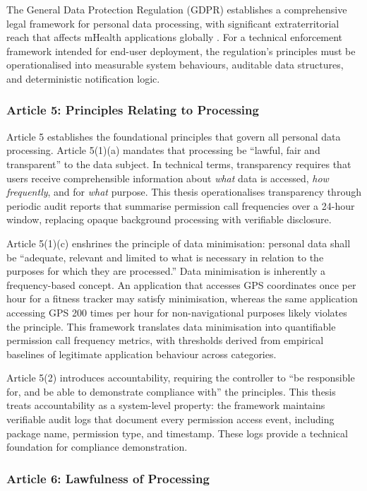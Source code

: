 The General Data Protection Regulation (GDPR) establishes a comprehensive legal framework for personal data processing, with significant extraterritorial reach that affects mHealth applications globally \cite{1}. For a technical enforcement framework intended for end-user deployment, the regulation's principles must be operationalised into measurable system behaviours, auditable data structures, and deterministic notification logic.

\subsubsection{Article 5: Principles Relating to Processing}

Article 5 establishes the foundational principles that govern all personal data processing. Article 5(1)(a) mandates that processing be ``lawful, fair and transparent'' to the data subject. In technical terms, transparency requires that users receive comprehensible information about \emph{what} data is accessed, \emph{how frequently}, and for \emph{what} purpose. This thesis operationalises transparency through periodic audit reports that summarise permission call frequencies over a 24-hour window, replacing opaque background processing with verifiable disclosure.

Article 5(1)(c) enshrines the principle of data minimisation: personal data shall be ``adequate, relevant and limited to what is necessary in relation to the purposes for which they are processed.'' Data minimisation is inherently a frequency-based concept. An application that accesses GPS coordinates once per hour for a fitness tracker may satisfy minimisation, whereas the same application accessing GPS 200 times per hour for non-navigational purposes likely violates the principle. This framework translates data minimisation into quantifiable permission call frequency metrics, with thresholds derived from empirical baselines of legitimate application behaviour across categories.

Article 5(2) introduces accountability, requiring the controller to ``be responsible for, and be able to demonstrate compliance with'' the principles. This thesis treats accountability as a system-level property: the framework maintains verifiable audit logs that document every permission access event, including package name, permission type, and timestamp. These logs provide a technical foundation for compliance demonstration.

\subsubsection{Article 6: Lawfulness of Processing}

